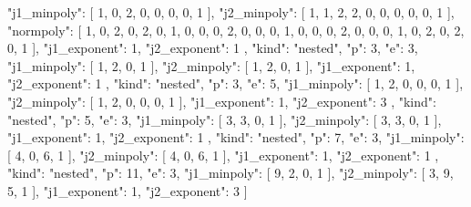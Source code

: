 \documentclass[11pt,a4paper]{article}
\begin{document}
\begin{CompleteProgram}
{    "j1_minpoly": [
      1,
      0,
      2,
      0,
      0,
      0,
      0,
      1
    ],
    "j2_minpoly": [
      1,
      1,
      2,
      2,
      0,
      0,
      0,
      0,
      0,
      1
    ],
    "normpoly": [
      1,
      0,
      2,
      0,
      2,
      0,
      1,
      0,
      0,
      0,
      2,
      0,
      0,
      0,
      1,
      0,
      0,
      0,
      2,
      0,
      0,
      0,
      1,
      0,
      2,
      0,
      2,
      0,
      1
    ],
    "j1_exponent": 1,
    "j2_exponent": 1
  },
  {
    "kind": "nested",
    "p": 3,
    "e": 3,
    "j1_minpoly": [
      1,
      2,
      0,
      1
    ],
    "j2_minpoly": [
      1,
      2,
      0,
      1
    ],
    "j1_exponent": 1,
    "j2_exponent": 1
  },
  {
    "kind": "nested",
    "p": 3,
    "e": 5,
    "j1_minpoly": [
      1,
      2,
      0,
      0,
      0,
      1
    ],
    "j2_minpoly": [
      1,
      2,
      0,
      0,
      0,
      1
    ],
    "j1_exponent": 1,
    "j2_exponent": 3
  },
  {
    "kind": "nested",
    "p": 5,
    "e": 3,
    "j1_minpoly": [
      3,
      3,
      0,
      1
    ],
    "j2_minpoly": [
      3,
      3,
      0,
      1
    ],
    "j1_exponent": 1,
    "j2_exponent": 1
  },
  {
    "kind": "nested",
    "p": 7,
    "e": 3,
    "j1_minpoly": [
      4,
      0,
      6,
      1
    ],
    "j2_minpoly": [
      4,
      0,
      6,
      1
    ],
    "j1_exponent": 1,
    "j2_exponent": 1
  },
  {
    "kind": "nested",
    "p": 11,
    "e": 3,
    "j1_minpoly": [
      9,
      2,
      0,
      1
    ],
    "j2_minpoly": [
      3,
      9,
      5,
      1
    ],
    "j1_exponent": 1,
    "j2_exponent": 3
  }
]
\end{CompleteProgram}
\end{document}
